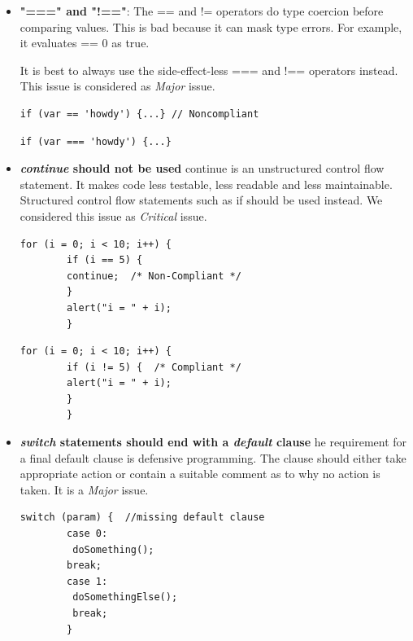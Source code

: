 \begin{itemize}
	\item \textbf{"===" and "!=="}:
The == and != operators do type coercion before comparing values. This is bad because it can mask type errors. For example, it evaluates    == 0 as true.

It is best to always use the side-effect-less === and !== operators instead. This issue is considered as \textit{Major} issue.

		\begin{lstlisting}[caption=Noncompliant Code Example]
		if (var == 'howdy') {...} // Noncompliant
		\end{lstlisting}
		
		\begin{lstlisting}[caption=Compliant Solution]
		if (var === 'howdy') {...}
		\end{lstlisting}


	\item \textbf{\textit{continue} should not be used}
	continue is an unstructured control flow statement. It makes code less testable, less readable and less maintainable. Structured control flow statements such as if should be used instead. We considered this issue as \textit{Critical} issue.
	
		
		\begin{lstlisting}[caption=Noncompliant Code Example]
		for (i = 0; i < 10; i++) {
		if (i == 5) {
		continue;  /* Non-Compliant */
		}
		alert("i = " + i);
		}
		\end{lstlisting}
		
		\begin{lstlisting}[caption=Compliant Solution]
		for (i = 0; i < 10; i++) {
		if (i != 5) {  /* Compliant */
		alert("i = " + i);
		}
		}
		\end{lstlisting}
	
	
	
	
	\item \textbf{ \textit{switch} statements should end with a \textit{default} clause}
	he requirement for a final default clause is defensive programming. The clause should either take appropriate action or contain a suitable comment as to why no action is taken. It is a \textit{Major} issue.
	

		
		\begin{lstlisting}[caption=Noncompliant Code Example]
		switch (param) {  //missing default clause
		case 0:
		 doSomething();
		break;
		case 1:
		 doSomethingElse();
		 break;
		}
		

\end{lstlisting}
\end{itemize}
